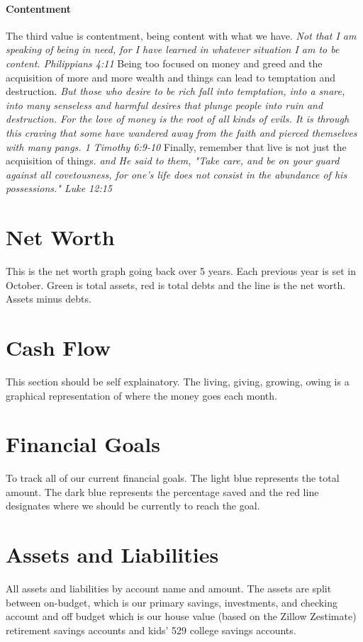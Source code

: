 \paragraph{Contentment} The third value is contentment, being content with what we have. \textit{Not that I am speaking of being in need, for I have learned in whatever situation I am to be content. Philippians 4:11} Being too focused on money and greed and the acquisition of more and more wealth and things can lead to temptation and destruction. \textit{But those who desire to be rich fall into temptation, into a snare, into many senseless and harmful desires that plunge people into ruin and destruction. For the love of money is the root of all kinds of evils. It is through this craving that some have wandered away from the faith and pierced themselves with many pangs. 1 Timothy 6:9-10} Finally, remember that live is not just the acquisition of things. \textit{and He said to them, "Take care, and be on your guard against all covetousness, for one's life does not consist in the abundance of his possessions." Luke 12:15}

\section*{Net Worth}
This is the net worth graph going back over 5 years. Each previous year is set in October. Green is total assets, red is total debts and the line is the net worth. Assets minus debts.

\section*{Cash Flow}
This section should be self explainatory. The living, giving, growing, owing is a graphical representation of where the money goes each month.

\section*{Financial Goals}
To track all of our current financial goals. The light blue represents the total amount. The dark blue represents the percentage saved and the red line designates where we should be currently to reach the goal. 

\section*{Assets and Liabilities}
All assets and liabilities by account name and amount. The assets are split between on-budget, which is our primary savings, investments, and checking account and off budget which is our house value (based on the Zillow Zestimate) retirement savings accounts and kids' 529 college savings accounts.

